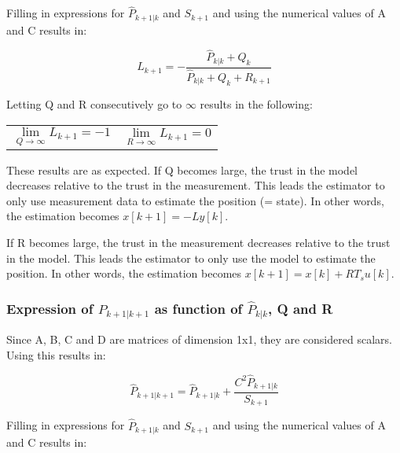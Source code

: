 \documentclass[a4paper]{article}
\newcommand{\newpar}{\vspace{.3cm}\noindent}
\begin{document}
\newpar
Filling in expressions for \(\hat{P}_{k+1|k}\) and \(S_{k+1}\) and using the numerical values of A and C results in:

\begin{equation}
    L_{k+1} = -\frac{\hat{P}_{k|k} + Q_{k}}{\hat{P}_{k|k} + Q_{k} + R_{k+1}}
    \label{eq:2bL}
\end{equation}

\newpar
Letting Q and R consecutively go to \(\infty\) results in the following:

\begin{center}
    \begin{tabular}{p{5cm}p{5cm}}
        \begin{equation}
            \lim_{Q\to\infty} L_{k+1} = -1
            \label{eq:LQinf}
        \end{equation}
        &  
        \begin{equation}
            \lim_{R\to\infty} L_{k+1} = 0
            \label{eq:LRinf}
        \end{equation}
        
    \end{tabular}
\end{center}

\newpar
These results are as expected. If Q becomes large, the trust in the model decreases relative to the trust in the measurement. This leads the estimator to only use measurement data to estimate the position (= state). In other words, the estimation becomes \(x[k+1] = -Ly[k]\).

\newpar
If R becomes large, the trust in the measurement decreases relative to the trust in the model. This leads the estimator to only use the model to estimate the position. In other words, the estimation becomes \(x[k+1] = x[k] + RT_{s}u[k]\).

\subsubsection{Expression of \(\hat{P}_{k+1|k+1}\) as function of \(\hat{P}_{k|k}\), Q and R}

Since A, B, C and D are matrices of dimension 1x1, they are considered scalars. Using this results in:

\begin{equation}
    \hat{P}_{k+1|k+1} = \hat{P}_{k+1|k} + \frac{C^2\hat{P}_{k+1|k}}{S_{k+1}}
\end{equation}

\newpar
Filling in expressions for \(\hat{P}_{k+1|k}\) and \(S_{k+1}\) and using the numerical values of A and C results in:
\end{document}
